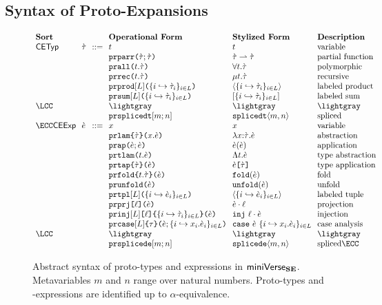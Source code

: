 \subsection{Syntax of Proto-Expansions}\label{sec:ce-syntax-U}
\begin{figure}
\hspace{-5px}$\arraycolsep=3.5pt\begin{array}{lllllll}
\textbf{Sort} & & & \textbf{Operational Form} & \textbf{Stylized Form} & \textbf{Description}\\
\mathsf{CETyp} & \ctau & ::= & t & t & \text{variable}\\
&&& \aceparr{\ctau}{\ctau} & \parr{\ctau}{\ctau} & \text{partial function}\\
&&& \aceall{t}{\ctau} & \forallt{t}{\ctau} & \text{polymorphic}\\
&&& \acerec{t}{\ctau} & \rect{t}{\ctau} & \text{recursive}\\
&&& \aceprod{\labelset}{\mapschema{\ctau}{i}{\labelset}} & \prodt{\mapschema{\ctau}{i}{\labelset}} & \text{labeled product}\\
&&& \acesum{\labelset}{\mapschema{\ctau}{i}{\labelset}} & \sumt{\mapschema{\ctau}{i}{\labelset}} & \text{labeled sum}\\
\LCC &&& \lightgray & \lightgray & \lightgray\\
&&& \acesplicedt{m}{n} & \splicedt{m}{n} & \text{spliced}\\\ECC
\mathsf{CEExp} & \ce & ::= & x & x & \text{variable}\\
&&& \acelam{\ctau}{x}{\ce} & \lam{x}{\ctau}{\ce} & \text{abstraction}\\
&&& \aceap{\ce}{\ce} & \ap{\ce}{\ce} & \text{application}\\
&&& \acetlam{t}{\ce} & \Lam{t}{\ce} & \text{type abstraction}\\
&&& \acetap{\ce}{\ctau} & \App{\ce}{\ctau} & \text{type application}\\
&&& \acefold{t}{\ctau}{\ce} & \fold{\ce} & \text{fold}\\
&&& \aceunfold{\ce} & \unfold{\ce} & \text{unfold}\\
&&& \acetpl{\labelset}{\mapschema{\ce}{i}{\labelset}} & \tpl{\mapschema{\ce}{i}{\labelset}} & \text{labeled tuple}\\
&&& \acepr{\ell}{\ce} & \prj{\ce}{\ell} & \text{projection}\\
&&& \acein{\labelset}{\ell}{\mapschema{\ctau}{i}{\labelset}}{\ce} & \inj{\ell}{\ce} & \text{injection}\\
&&& \acecase{\labelset}{\tau}{\ce}{\mapschemab{x}{\ce}{i}{\labelset}} & \caseof{\ce}{\mapschemab{x}{\ce}{i}{\labelset}} & \text{case analysis}\\
\LCC &&& \lightgray & \lightgray & \lightgray\\
&&& \acesplicede{m}{n} & \splicede{m}{n} & \text{spliced}\ECC
\end{array}$
\caption[Syntax of proto-types and expressions in $\miniVerseUE$]{Abstract syntax of proto-types and expressions in $\miniVerseUE$. Metavariables $m$ and $n$ range over natural numbers. Proto-types and -expressions are identified up to $\alpha$-equivalence.}
\label{fig:U-candidate-terms}
\end{figure}

